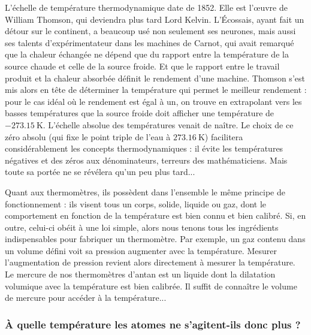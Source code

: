 L'échelle de température thermodynamique date de 1852. Elle est l'œuvre de William Thomson, qui deviendra plus tard Lord Kelvin. L'Écossais, ayant fait un détour sur le continent, a beaucoup usé non seulement ses neurones, mais aussi ses talents d'expérimentateur dans les machines de Carnot, qui avait remarqué que la chaleur échangée ne dépend que du rapport entre la température de la source chaude et celle de la source froide. Et que le rapport entre le travail produit et la chaleur absorbée définit le rendement d'une machine. Thomson s'est mis alors en tête de déterminer la température qui permet le meilleur rendement : pour le cas idéal où le rendement est égal à un, on trouve en extrapolant vers les basses températures que la source froide doit afficher une température de \(\SI{-273.15}{\kelvin}\). L'échelle absolue des températures venait de naître. Le choix de ce zéro absolu (qui fixe le point triple de l'eau à \(\SI{+273.16}{\kelvin}\)) facilitera considérablement les concepts thermodynamiques : il évite les températures négatives et des zéros aux dénominateurs, terreurs des mathématiciens. Mais toute sa portée ne se révélera qu'un peu plus tard...

Quant aux thermomètres, ils possèdent dans l'ensemble le même principe de fonctionnement : ils visent tous un corps, solide, liquide ou gaz, dont le comportement en fonction de la température est bien connu et bien calibré. Si, en outre, celui-ci obéit à une loi simple, alors nous tenons tous les ingrédients indispensables pour fabriquer un thermomètre. Par exemple, un gaz contenu dans un volume défini voit sa pression augmenter avec la température. Mesurer l'augmentation de pression revient alors directement à mesurer la température. Le mercure de nos thermomètres d'antan est un liquide dont la dilatation volumique avec la température est bien calibrée. Il suffit de connaître le volume de mercure pour accéder à la température...

\subsubsection{À quelle température les atomes ne s'agitent-ils donc plus ?}

